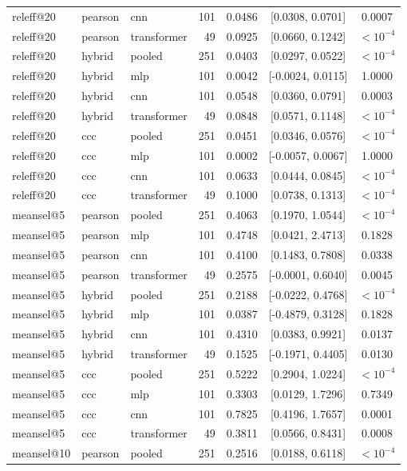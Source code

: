 \begin{longtable}{lllrrcc}
releff@20 & pearson & cnn & 101 & 0.0486 & [0.0308, 0.0701] & 0.0007 \\
releff@20 & pearson & transformer & 49 & 0.0925 & [0.0660, 0.1242] & $<10^{-4}$ \\
releff@20 & hybrid & pooled & 251 & 0.0403 & [0.0297, 0.0522] & $<10^{-4}$ \\
releff@20 & hybrid & mlp & 101 & 0.0042 & [-0.0024, 0.0115] & 1.0000 \\
releff@20 & hybrid & cnn & 101 & 0.0548 & [0.0360, 0.0791] & 0.0003 \\
releff@20 & hybrid & transformer & 49 & 0.0848 & [0.0571, 0.1148] & $<10^{-4}$ \\
releff@20 & ccc & pooled & 251 & 0.0451 & [0.0346, 0.0576] & $<10^{-4}$ \\
releff@20 & ccc & mlp & 101 & 0.0002 & [-0.0057, 0.0067] & 1.0000 \\
releff@20 & ccc & cnn & 101 & 0.0633 & [0.0444, 0.0845] & $<10^{-4}$ \\
releff@20 & ccc & transformer & 49 & 0.1000 & [0.0738, 0.1313] & $<10^{-4}$ \\
meansel@5 & pearson & pooled & 251 & 0.4063 & [0.1970, 1.0544] & $<10^{-4}$ \\
meansel@5 & pearson & mlp & 101 & 0.4748 & [0.0421, 2.4713] & 0.1828 \\
meansel@5 & pearson & cnn & 101 & 0.4100 & [0.1483, 0.7808] & 0.0338 \\
meansel@5 & pearson & transformer & 49 & 0.2575 & [-0.0001, 0.6040] & 0.0045 \\
meansel@5 & hybrid & pooled & 251 & 0.2188 & [-0.0222, 0.4768] & $<10^{-4}$ \\
meansel@5 & hybrid & mlp & 101 & 0.0387 & [-0.4879, 0.3128] & 0.1828 \\
meansel@5 & hybrid & cnn & 101 & 0.4310 & [0.0383, 0.9921] & 0.0137 \\
meansel@5 & hybrid & transformer & 49 & 0.1525 & [-0.1971, 0.4405] & 0.0130 \\
meansel@5 & ccc & pooled & 251 & 0.5222 & [0.2904, 1.0224] & $<10^{-4}$ \\
meansel@5 & ccc & mlp & 101 & 0.3303 & [0.0129, 1.7296] & 0.7349 \\
meansel@5 & ccc & cnn & 101 & 0.7825 & [0.4196, 1.7657] & 0.0001 \\
meansel@5 & ccc & transformer & 49 & 0.3811 & [0.0566, 0.8431] & 0.0008 \\
meansel@10 & pearson & pooled & 251 & 0.2516 & [0.0188, 0.6118] & $<10^{-4}$ \\

\end{longtable}
